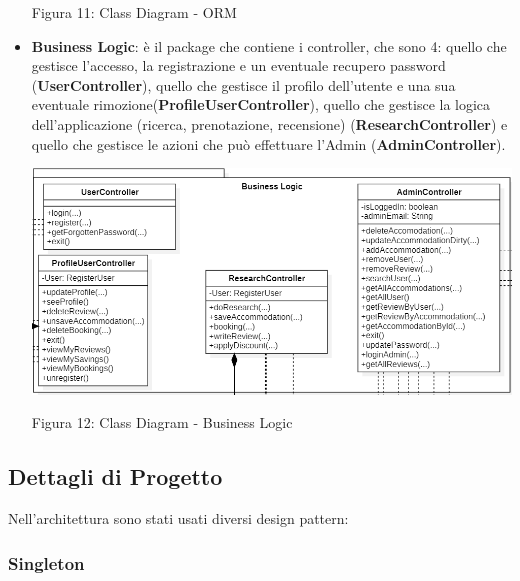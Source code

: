 \documentclass[10pt]{article}
\begin{document}
\begin{itemize}
\par\medskip
\begin{center}
Figura 11: Class Diagram - ORM
\end{center}
\par\medskip
\item \textbf{Business Logic}: è il package che contiene i controller, che sono 4: quello che gestisce l'accesso, la registrazione e un eventuale recupero password (\textbf{UserController}), quello che gestisce il profilo dell'utente e una sua eventuale rimozione(\textbf{ProfileUserController}), quello che gestisce la logica dell'applicazione (ricerca, prenotazione, recensione) (\textbf{ResearchController}) e quello che gestisce le azioni che può effettuare l'Admin (\textbf{AdminController}).  
\par\medskip
\hspace*{-1.5cm}
\includegraphics[scale=0.6]{uml/BusinessLogic}
\begin{center}
Figura 12: Class Diagram - Business Logic 
\end{center}

\end{itemize}
\subsection{Dettagli di Progetto}
Nell'architettura sono stati usati diversi design pattern:
\subsubsection{Singleton}
\end{document}
